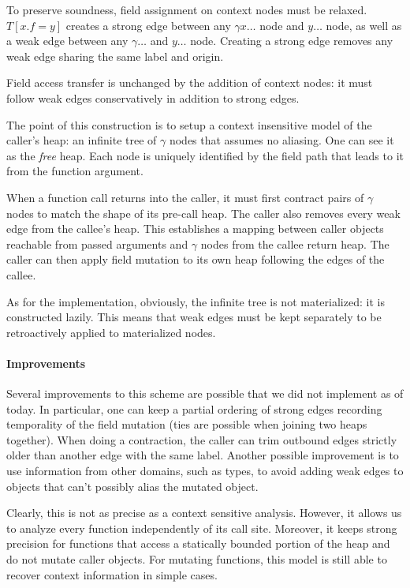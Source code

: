 \documentclass[11pt]{article}
\begin{document}
To preserve soundness, field assignment on context nodes must be relaxed. 
$T[x.f=y]$ creates a strong edge between any $\gamma x \dots$ node and $y\dots$ node, as well as a weak edge between any $\gamma\dots$ and $y\dots$ node.
Creating a strong edge removes any weak edge sharing the same label and origin.

Field access transfer is unchanged by the addition of context nodes: it must follow weak edges conservatively in addition to strong edges.

The point of this construction is to setup a context insensitive model of the caller's heap: an infinite tree of $\gamma$ nodes that assumes no aliasing.
One can see it as the \emph{free} heap. Each node is uniquely identified by the field path that leads to it from the function argument.

When a function call returns into the caller, it must first contract pairs of $\gamma$ nodes to match the shape of its pre-call heap.
The caller also removes every weak edge from the callee's heap.
This establishes a mapping between caller objects reachable from passed arguments and $\gamma$ nodes from the callee return heap.
The caller can then apply field mutation to its own heap following the edges of the callee.

As for the implementation, obviously, the infinite tree is not materialized: it is constructed lazily.
This means that weak edges must be kept separately to be retroactively applied to materialized nodes.

\paragraph{Improvements} Several improvements to this scheme are possible that we did not implement as of today.
In particular, one can keep a partial ordering of strong edges recording temporality of the field mutation (ties are possible when joining two heaps together).
When doing a contraction, the caller can trim outbound edges strictly older than another edge with the same label.
Another possible improvement is to use information from other domains, such as types, to avoid adding weak edges to objects that can't possibly alias the mutated object.

Clearly, this is not as precise as a context sensitive analysis.
However, it allows us to analyze every function independently of its call site.
Moreover, it keeps strong precision for functions that access a statically bounded portion of the heap and do not mutate caller objects.
For mutating functions, this model is still able to recover context information in simple cases.
\end{document}
